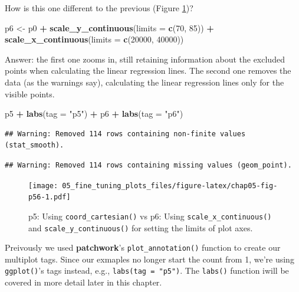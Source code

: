 \documentclass[
  12pt,
  krantz2]{krantz}
\makeatletter
\newenvironment{Shaded}{\begin{snugshade}}{\end{snugshade}}
\newcommand{\DataTypeTok}[1]{\textcolor[rgb]{0.13,0.29,0.53}{#1}}
\newcommand{\DecValTok}[1]{\textcolor[rgb]{0.00,0.00,0.81}{#1}}
\newcommand{\KeywordTok}[1]{\textcolor[rgb]{0.13,0.29,0.53}{\textbf{#1}}}
\newcommand{\NormalTok}[1]{#1}
\newcommand{\OperatorTok}[1]{\textcolor[rgb]{0.81,0.36,0.00}{\textbf{#1}}}
\newcommand{\StringTok}[1]{\textcolor[rgb]{0.31,0.60,0.02}{#1}}
\newenvironment{kframe}{%
\medskip{}
\setlength{\fboxsep}{.8em}
 \def\at@end@of@kframe{}%
 \ifinner\ifhmode%
  \def\at@end@of@kframe{\end{minipage}}%
  \begin{minipage}{\columnwidth}%
 \fi\fi%
 \def\FrameCommand##1{\hskip\@totalleftmargin \hskip-\fboxsep
 \colorbox{shadecolor}{##1}\hskip-\fboxsep
     \hskip-\linewidth \hskip-\@totalleftmargin \hskip\columnwidth}%
 \MakeFramed {\advance\hsize-\width
   \@totalleftmargin\z@ \linewidth\hsize
   \@setminipage}}%
 {\par\unskip\endMakeFramed%
 \at@end@of@kframe}
\renewenvironment{Shaded}{\begin{kframe}}{\end{kframe}}
\makeatother
\begin{document}
How is this one different to the previous (Figure \ref{fig:chap05-fig-p56})?

\begin{Shaded}
\begin{Highlighting}[]
\NormalTok{p6 <-}\StringTok{ }\NormalTok{p0 }\OperatorTok{+}
\StringTok{  }\KeywordTok{scale_y_continuous}\NormalTok{(}\DataTypeTok{limits =} \KeywordTok{c}\NormalTok{(}\DecValTok{70}\NormalTok{, }\DecValTok{85}\NormalTok{)) }\OperatorTok{+}
\StringTok{  }\KeywordTok{scale_x_continuous}\NormalTok{(}\DataTypeTok{limits =} \KeywordTok{c}\NormalTok{(}\DecValTok{20000}\NormalTok{, }\DecValTok{40000}\NormalTok{)) }
\end{Highlighting}
\end{Shaded}

Answer: the first one zooms in, still retaining information about the excluded points when calculating the linear regression lines.
The second one removes the data (as the warnings say), calculating the linear regression lines only for the visible points.

\begin{Shaded}
\begin{Highlighting}[]
\NormalTok{p5 }\OperatorTok{+}\StringTok{ }\KeywordTok{labs}\NormalTok{(}\DataTypeTok{tag =} \StringTok{"p5"}\NormalTok{) }\OperatorTok{+}\StringTok{ }\NormalTok{p6 }\OperatorTok{+}\StringTok{ }\KeywordTok{labs}\NormalTok{(}\DataTypeTok{tag =} \StringTok{"p6"}\NormalTok{)}
\end{Highlighting}
\end{Shaded}

\begin{verbatim}
## Warning: Removed 114 rows containing non-finite values (stat_smooth).
\end{verbatim}

\begin{verbatim}
## Warning: Removed 114 rows containing missing values (geom_point).
\end{verbatim}

\begin{figure}
\centering
\texttt{[image: 05\_fine\_tuning\_plots\_files/figure-latex/chap05-fig-p56-1.pdf]}
\caption{\label{fig:chap05-fig-p56}p5: Using \texttt{coord\_cartesian()} vs p6: Using \texttt{scale\_x\_continuous()} and \texttt{scale\_y\_continuous()} for setting the limits of plot axes.}
\end{figure}

Preivously we used \textbf{patchwork}'s \texttt{plot\_annotation()} function to create our multiplot tags.
Since our exmaples no longer start the count from 1, we're using \texttt{ggplot()}'s tags instead, e.g., \texttt{labs(tag\ =\ "p5")}.
The \texttt{labs()} function iwill be covered in more detail later in this chapter.
\end{document}
